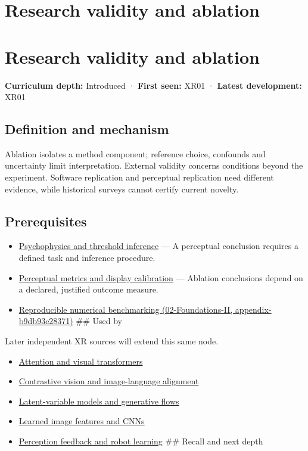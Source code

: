\hypertarget{appendix-65788587ef78}{}
\section*{Research validity and ablation}
\section{Research validity and ablation}\label{appendix-65788587ef78-research-validity-and-ablation}

\textbf{Curriculum depth:} Introduced · \textbf{First seen:} XR01 · \textbf{Latest development:} XR01

\subsection{Definition and mechanism}\label{appendix-65788587ef78-definition-and-mechanism}

Ablation isolates a method component; reference choice, confounds and uncertainty limit interpretation. External validity concerns conditions beyond the experiment. Software replication and perceptual replication need different evidence, while historical surveys cannot certify current novelty.

\subsection{Prerequisites}\label{appendix-65788587ef78-prerequisites}

\begin{itemize}
\item
  \hyperref[appendix-1759f03e8ce7]{Psychophysics and threshold inference} --- A perceptual conclusion requires a defined task and inference procedure.
\item
  \hyperref[appendix-b2c1846508bf]{Perceptual metrics and display calibration} --- Ablation conclusions depend on a declared, justified outcome measure.
\item
  \href{../02-Foundations-II/main.pdf\#nameddest=appendix-b9db93e28371}{Reproducible numerical benchmarking (02-Foundations-II, appendix-b9db93e28371)} \#\# Used by
\end{itemize}

Later independent XR sources will extend this same node.

\begin{itemize}
\tightlist
\item
  \hyperref[appendix-a9d5dfdd164a]{Attention and visual transformers}
\item
  \hyperref[appendix-772f1fd96148]{Contrastive vision and image-language alignment}
\item
  \hyperref[appendix-2c568f05ee34]{Latent-variable models and generative flows}
\item
  \hyperref[appendix-47c51ea026fb]{Learned image features and CNNs}
\item
  \hyperref[appendix-b0c42da325f1]{Perception feedback and robot learning} \#\# Recall and next depth
\end{itemize}

